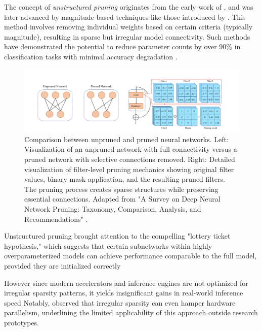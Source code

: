 \documentclass[12pt,a4paper]{article}
\begin{document}
The concept of \textit{unstructured pruning} originates from the early work of \cite{LeCun1990Optimal}, and was later advanced by magnitude-based techniques like those introduced by \cite{Han2015Learning}. This method involves removing individual weights based on certain criteria (typically magnitude), resulting in sparse but irregular model connectivity. Such methods have demonstrated the potential to reduce parameter counts by over 90\% in classification tasks with minimal accuracy degradation \cite{Han2015deep, Frankle2019Lottery}.

\begin{figure}[H]
\centering
\includegraphics[width=\textwidth]{pruned_network.png}
\caption{Comparison between unpruned and pruned neural networks. Left: Visualization of an unpruned network with full connectivity versus a pruned network with selective connections removed. Right: Detailed visualization of filter-level pruning mechanics showing original filter values, binary mask application, and the resulting pruned filters. The pruning process creates sparse structures while preserving essential connections. Adapted from "A Survey on Deep Neural Network Pruning: Taxonomy, Comparison, Analysis, and Recommendations" \cite{Cheng2024}.}
\label{fig:pruning_types}
\end{figure}

Unstructured pruning brought attention to the compelling "lottery ticket hypothesis," which suggests that certain subnetworks within highly overparameterized models can achieve performance comparable to the full model, provided they are initialized correctly \cite{Frankle2019Lottery}

However since modern accelerators and inference engines are not optimized for irregular sparsity patterns, it yields insignificant gains in real-world inference speed \cite{Gale2020Sparse} Notably, \cite{He2017Channel} observed that irregular sparsity can even hamper hardware parallelism, underlining the limited applicability of this approach outside research prototypes.
\end{document}
